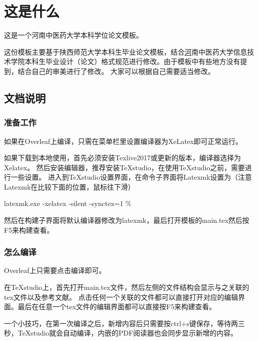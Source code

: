 
\chapter[这是什么]{这是什么}  %
这是一个河南中医药大学本科学位论文模板。

这份模板主要基于陕西师范大学本科生毕业论文模板，结合\href{https://xxjsxy.hactcm.edu.cn/info/1041/2047.htm}河南中医药大学信息技术学院本科生毕业设计（论文）格式规范进行修改。由于模板中有些地方没有提到，结合自己的审美进行了修改。
大家可以根据自己需要适当修改。

\section{文档说明}

\subsection{准备工作}

如果在Overleaf上编译，只需在菜单栏里设置编译器为XeLatex即可正常运行。

如果下载到本地使用，首先必须安装Texlive2017或更新的版本，编译器选择为Xelatex。
然后安装编辑器，推荐安装TeXstudio，在使用TeXstudio之前，需要进行一些设置。
进入到TeXstudio设置界面，在命令子界面将Latexmk设置为（注意Latexmk在比较下面的位置，鼠标往下滑）

{\centering latexmk.exe -xelatex -silent -synctex=1 \% \par}
然后在构建子界面将默认编译器修改为latexmk，最后打开模板的main.tex然后按F5来构建查看。

\subsection{怎么编译}

Overleaf上只需要点击编译即可。

在TeXstudio上，首先打开main.tex文件，然后左侧的文件结构会显示与之关联的tex文件以及参考文献。
点击任何一个关联的文件都可以直接打开对应的编辑界面。最后在任意一个tex文件的编辑界面都可以直接按F5来构建查看。

一个小技巧，在第一次编译之后，新增内容后只需要按ctrl+s键保存，等待两三秒，TeXstudio就会自动编译，内嵌的PDF阅读器也会同步显示新增的内容。

